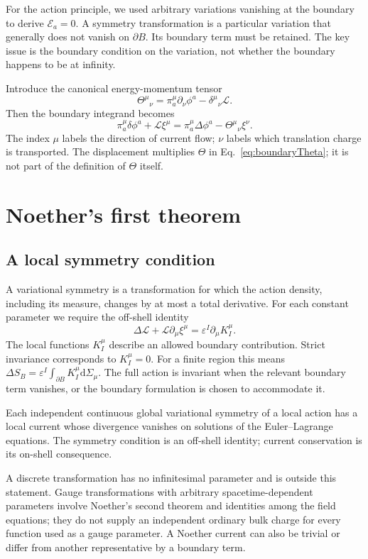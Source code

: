 \documentclass[11pt]{article}
\newcommand{\dd}{\mathrm{d}}
\newcommand{\Lag}{\mathcal{L}}
\newcommand{\Th}{\Theta}
\newcommand{\Eul}{\mathcal E}
\begin{document}
For the action principle, we used arbitrary variations vanishing at the
boundary to derive \(\Eul_a=0\). A symmetry transformation is a particular
variation that generally does not vanish on \(\partial B\). Its boundary
term must be retained. The key issue is the boundary condition on the
variation, not whether the boundary happens to be at infinity.

Introduce the canonical energy-momentum tensor
\begin{equation}
\boxed{\Th^\mu{}_{\nu}
=\pi_a^\mu\partial_\nu\phi^a-\delta^\mu{}_{\nu}\Lag.}
\label{eq:Theta}
\end{equation}
Then the boundary integrand becomes
\begin{equation}
\pi_a^\mu\delta\phi^a+\Lag\xi^\mu
=\pi_a^\mu\Delta\phi^a-\Th^\mu{}_{\nu}\xi^\nu.
\label{eq:boundaryTheta}
\end{equation}
The index \(\mu\) labels the direction of current flow; \(\nu\) labels
which translation charge is transported. The displacement multiplies
\(\Th\) in Eq.~\eqref{eq:boundaryTheta}; it is not part of the definition
of \(\Th\) itself.

\section{Noether's first theorem}

\subsection{A local symmetry condition}
A variational symmetry is a transformation for which the action density,
including its measure, changes by at most a total derivative. For each
constant parameter we require the off-shell identity
\begin{equation}
\boxed{\Delta\Lag+\Lag\partial_\mu\xi^\mu
=\varepsilon^I\partial_\mu K_I^\mu.}
\label{eq:symmetryCondition}
\end{equation}
The local functions \(K_I^\mu\) describe an allowed boundary contribution.
Strict invariance corresponds to \(K_I^\mu=0\).
For a finite region this means
\(\Delta S_B=\varepsilon^I\int_{\partial B}K_I^\mu\dd\Sigma_\mu\).
The full action is invariant when the relevant boundary term vanishes,
or the boundary formulation is chosen to accommodate it.

\begin{keyidea}
Each independent continuous global variational symmetry of a local action
has a local current whose divergence vanishes on solutions of the
Euler--Lagrange equations. The symmetry condition is an off-shell identity;
current conservation is its on-shell consequence.
\end{keyidea}
A discrete transformation has no infinitesimal parameter and is outside
this statement. Gauge transformations with arbitrary spacetime-dependent
parameters involve Noether's second theorem and identities among the
field equations; they do not supply an independent ordinary bulk charge
for every function used as a gauge parameter. A Noether current can also
be trivial or differ from another representative by a boundary term.
\end{document}
